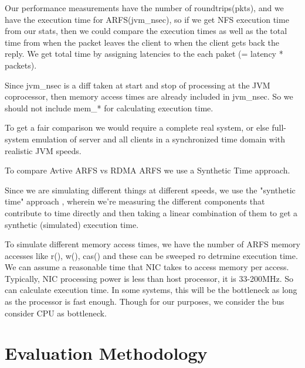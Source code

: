 \documentclass[10pt]{article}
\begin{document}
\begin{itemize}
\begin{itemize}
Our performance measurements have the number of roundtrips(pkts), and we have
the execution time for ARFS(jvm_nsec), so if we get NFS execution time from
our stats, then we could compare the execution times as well as the total time
from when the packet leaves the client to when the client gets back the reply.
We get total time by assigning latencies to the each paket (= latency * packets).

Since jvm_nsec is a diff taken at start and stop of processing at the JVM coprocessor,
then memory access times are already included in jvm_nsec. So we should not include mem_* for
calculating execution time.

To get a fair comparison we would require a complete real system, or else full-system emulation of
server and all clients in a synchronized time domain with realistic JVM speeds.

To compare Avtive ARFS vs RDMA ARFS we use a Synthetic Time approach.

Since we are simulating different things at different speeds, we use the "synthetic time"
approach , wherein we're measuring the different components that contribute to time directly
and then taking a linear combination of them to get a synthetic (simulated) execution time.

To simulate different memory access times, we have the number of ARFS memory accesses like
r(), w(), cas() and these can be sweeped ro detrmine execution time. We can assume a reasonable
time that NIC takes to access memory per access. Typically, NIC processing power is less than host
processor, it is 33-200MHz. So can calculate execution time. In some systems, this will be the
bottleneck as long as the processor is fast enough. Though for our purposes, we consider the bus
consider CPU as bottleneck. 

\section{Evaluation Methodology}


\end{itemize}
\end{itemize}
\end{document}
